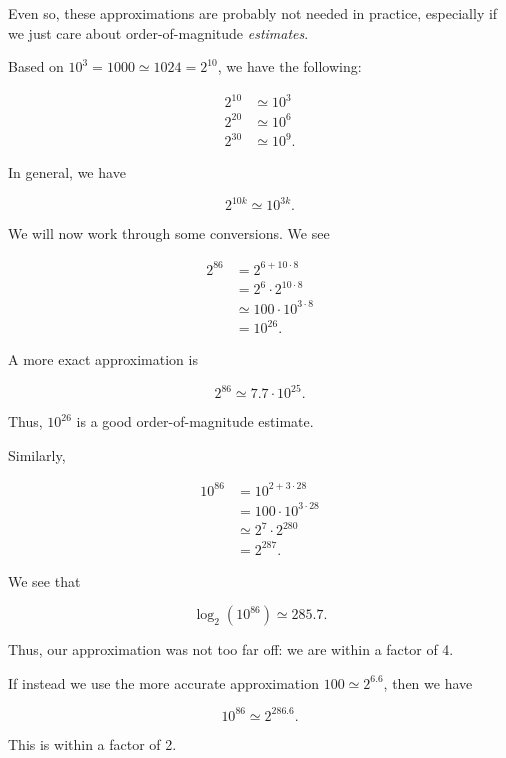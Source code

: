 \noindent
Even so, these approximations are probably not needed in practice,
especially if we just care about order-of-magnitude \emph{estimates}.

Based on $10^{3} = 1000 \simeq 1024 = 2^{10}$, we have the following:

\begin{align}
    2^{10} &\simeq 10^{3} \nonumber\\
    2^{20} &\simeq 10^{6} \nonumber\\
    2^{30} &\simeq 10^{9}.
\end{align}

\noindent
In general, we have

\begin{equation}
    2^{10k} \simeq 10^{3k}.
\end{equation}

\begin{example}

We will now work through some conversions.
We see

\begin{align}
    2^{86} &= 2^{6 + 10\cdot8} \nonumber\\
        &= 2^{6}\cdot2^{10\cdot8} \nonumber\\
        &\simeq 100\cdot10^{3\cdot8} \nonumber\\
        &= 10^{26}.
\end{align}

\noindent
A more exact approximation is

\begin{equation}
    2^{86} \simeq 7.7\cdot10^{25}.
\end{equation}

\noindent
Thus, $10^{26}$ is a good order-of-magnitude estimate.

Similarly,

\begin{align}
    10^{86} &= 10^{2 + 3\cdot28} \nonumber\\
        &= 100\cdot10^{3\cdot28} \nonumber\\
        &\simeq 2^{7}\cdot 2^{280} \nonumber\\
        &= 2^{287}.
\end{align}

\noindent
We see that

\begin{equation}
    \log_{2}(10^{86}) \simeq 285.7.
\end{equation}

\noindent
Thus, our approximation was not too far off:
we are within a factor of 4.

If instead we use the more accurate approximation $100 \simeq 2^{6.6}$,
then we have

\begin{equation}
    10^{86} \simeq 2^{286.6}.
\end{equation}

\noindent
This is within a factor of 2.
\end{example}
